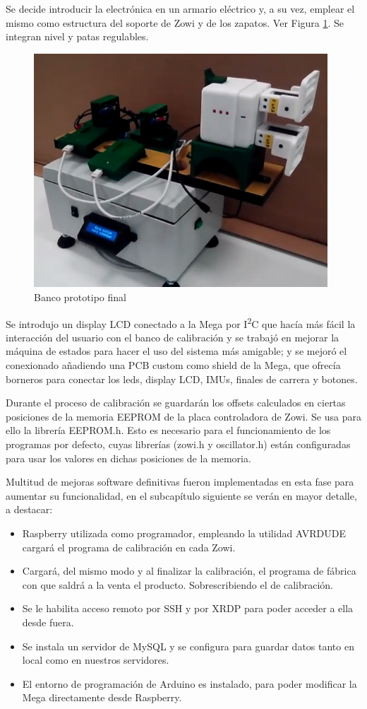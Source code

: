 Se decide introducir la electrónica en un armario eléctrico y, a su vez, emplear el mismo como estructura del soporte de Zowi y de los zapatos. Ver Figura \ref{fig:bancov4}. Se integran nivel y patas regulables.

\begin{figure}
\centering
\includegraphics[width=110mm]{Figures/banco_v4}
\caption{Banco prototipo final}
\label{fig:bancov4}
\end{figure}

Se introdujo un display LCD conectado a la Mega por I\textsuperscript{2}C que hacía más fácil la interacción del usuario con el banco de calibración y se trabajó en mejorar la máquina de estados para hacer el uso del sistema más amigable; y se mejoró el conexionado añadiendo una PCB custom como shield de la Mega, que ofrecía borneros para conectar los leds, display LCD, IMUs, finales de carrera y botones.

Durante el proceso de calibración se guardarán los offsets calculados en ciertas posiciones de la memoria EEPROM de la placa controladora de Zowi. Se usa para ello la librería EEPROM.h. Esto es necesario para el funcionamiento de los programas por defecto, cuyas librerías (zowi.h y oscillator.h) están configuradas para usar los valores en dichas posiciones de la memoria.

Multitud de mejoras software definitivas fueron implementadas en esta fase para aumentar su funcionalidad, en el subcapítulo siguiente se verán en mayor detalle, a destacar:
\begin{itemize}
  \item Raspberry utilizada como programador, empleando la utilidad AVRDUDE cargará el programa de calibración en cada Zowi.
  \item Cargará, del mismo modo y al finalizar la calibración, el programa de fábrica con que saldrá a la venta el producto. Sobrescribiendo el de calibración.
  \item Se le habilita acceso remoto por SSH y por XRDP para poder acceder a ella desde fuera.
  \item Se instala un servidor de MySQL y se configura para guardar datos tanto en local como en nuestros servidores.
  \item El entorno de programación de Arduino es instalado, para poder modificar la Mega directamente desde Raspberry.
\end{itemize}

